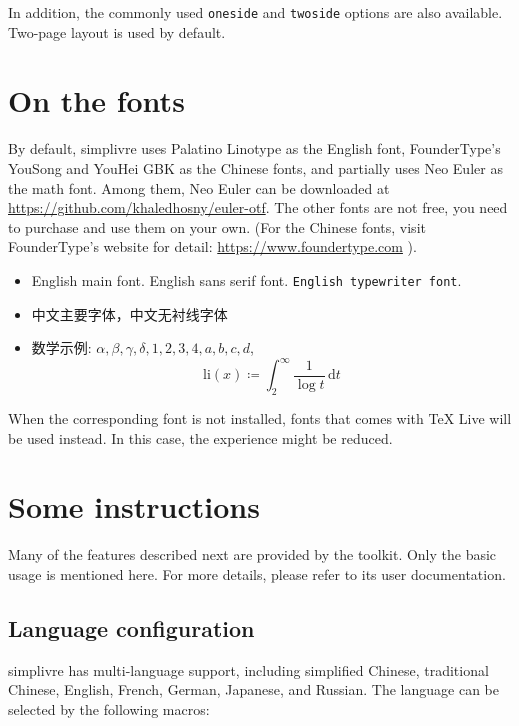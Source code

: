 \documentclass{simplivre}
\newenvironment{remind}[1][Remind]{%
    \LocallyStopLineNumbers%
    \begin{tcolorbox}[breakable,
        enhanced,
        width = \textwidth,
        colback = white, colbacktitle = paper,
        colframe = gray!50, boxrule=0.2mm,
        coltitle = black,
        fonttitle = \sffamily,
        attach boxed title to top left = {yshift=-\tcboxedtitleheight/2,  xshift=\tcboxedtitlewidth/4},
        boxed title style = {boxrule=0pt, colframe=paper},
        before skip = 0.3cm,
        after skip = 0.3cm,
        top = 3mm,
        bottom = 3mm,
        title={\sffamily #1}]%
}{\end{tcolorbox}\ResumeLineNumbers}
\providecommand{\simplivre}{\textsf{simplivre}}
\begin{document}
\bigskip
In addition, the commonly used \texttt{oneside} and \texttt{twoside} options are also available. Two-page layout is used by default.

\chapter{On the fonts}
By default, \simplivre{} uses Palatino Linotype as the English font, FounderType's YouSong and YouHei GBK as the Chinese fonts, and partially uses Neo Euler as the math font. Among them, Neo Euler can be downloaded at \url{https://github.com/khaledhosny/euler-otf}. The other fonts are not free, you need to purchase and use them on your own. (For the Chinese fonts, visit FounderType's website for detail: \url{https://www.foundertype.com} ).

\begin{remind}[Font demonstration]
    \begin{itemize}
        \item English main font. \textsf{English sans serif font}. \texttt{English typewriter font}.
        \item 中文主要字体，\textsf{中文无衬线字体}
        \item 数学示例:  \( \alpha, \beta, \gamma, \delta, 1,2,3,4, a,b,c,d \), \[\mathrm{li}(x)\coloneqq \int_2^{\infty} \frac{1}{\log t}\,\mathrm{d}t \]
    \end{itemize}
\end{remind}

\bigskip
When the corresponding font is not installed, fonts that comes with TeX Live will be used instead. In this case, the experience might be reduced.


\chapter{Some instructions}

\vspace{-1.5\baselineskip}
Many of the features described next are provided by the \ProjLib{} toolkit. Only the basic usage is mentioned here. For more details, please refer to its user documentation.

\section{Language configuration}

\simplivre{} has multi-language support, including simplified Chinese, traditional Chinese, English, French, German, Japanese, and Russian. The language can be selected by the following macros:
\end{document}
